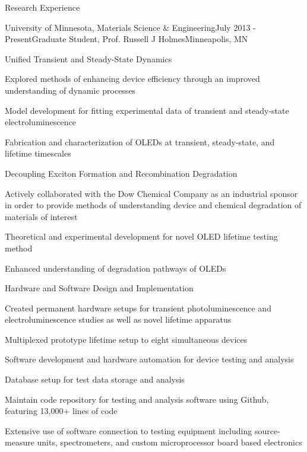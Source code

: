 \documentclass{resume} %
\begin{document}

\begin{rSection}{Research Experience}

\begin{rSubsection}{University of Minnesota, Materials Science \& Engineering}{July 2013 - Present}{Graduate Student, Prof. Russell J Holmes}{Minneapolis, MN}
\vspace{-.5 em}
\hspace{-0.5em}{\em Supported via UMN-Dow Chemical University Partnership Initiative} \smallskip \\
\begin{rSubsubsection}{Unified Transient and Steady-State Dynamics}
\item Explored methods of enhancing device efficiency through an improved understanding of dynamic processes 
\item Model development for fitting experimental data of transient and steady-state electroluminescence
\item Fabrication and characterization of OLEDs at transient, steady-state, and lifetime timescales
\end{rSubsubsection}
\begin{rSubsubsection}{Decoupling Exciton Formation and Recombination Degradation}
\item Actively collaborated with the Dow Chemical Company as an industrial sponsor in order to provide methods of understanding device and chemical degradation of materials of interest
\item Theoretical and experimental development for novel OLED lifetime testing method 
\item Enhanced understanding of degradation pathways of OLEDs
\end{rSubsubsection}
\begin{rSubsubsection}{Hardware and Software Design and Implementation}
\item Created permanent hardware setups for transient photoluminescence and electroluminescence studies as well as novel lifetime apparatus
\item Multiplexed prototype lifetime setup to eight simultaneous devices
\item Software development and hardware automation for device testing and analysis
\item Database setup for test data storage and analysis
\item Maintain code repository for testing and analysis software using Github, featuring 13,000+ lines of code
\item Extensive use of software connection to testing equipment including source-measure units, spectrometers, and custom microprocessor board based electronics
\end{rSubsubsection}
\end{rSubsection}


\end{rSection}
\end{document}
